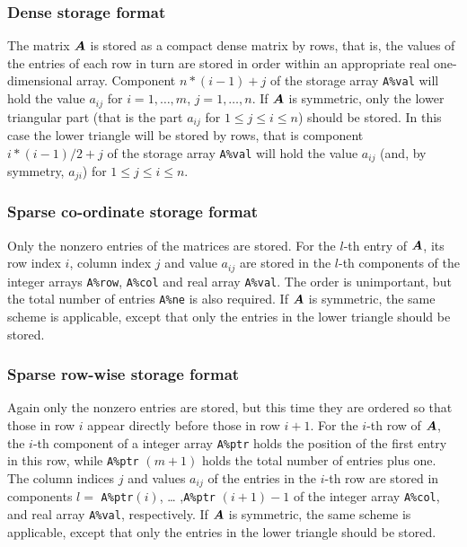 \documentclass{galahad}
\begin{document}
\subsubsection{Dense storage format}\label{dense}
The matrix ${\bm{A}}$ is stored as a compact 
dense matrix by rows, that is, the values of the entries of each row in turn are
stored in order within an appropriate real one-dimensional array.
Component $n \ast (i-1) + j$ of the storage array {\tt A\%val} will hold the 
value $a_{ij}$ for $i = 1, \ldots , m$, $j = 1, \ldots , n$.
If ${\bm{A}}$ is symmetric, only the lower triangular part (that is the part 
$a_{ij}$ for $1 \leq j \leq i \leq n$) should be stored.  In this case
the lower triangle will be stored by rows, that is 
component $i \ast (i-1)/2 + j$ of the storage array {\tt A\%val}  
will hold the value $a_{ij}$ (and, by symmetry, $a_{ji}$)
for $1 \leq j \leq i \leq n$.

\subsubsection{Sparse co-ordinate storage format}\label{coordinate}
Only the nonzero entries of the matrices are stored. For the $l$-th
entry of ${\bm{A}}$, its row index $i$, column index $j$ and value
$a_{ij}$ are stored in the $l$-th components of the integer arrays
{\tt A\%row}, {\tt A\%col} and real array {\tt A\%val}.  The order is
unimportant, but the total number of entries {\tt A\%ne} is also
required.  If ${\bm{A}}$ is symmetric, the same scheme is applicable,
except that only the entries in the lower triangle should be stored.

\subsubsection{Sparse row-wise storage format}\label{rowwise}
Again only the nonzero entries are stored, but this time they are
ordered so that those in row $i$ appear directly before those in row
$i+1$. For the $i$-th row of ${\bm{A}}$, the $i$-th component of a integer
array {\tt A\%ptr} holds the position of the first entry in this row,
while {\tt A\%ptr} $(m+1)$ holds the total number of entries plus one.
The column indices $j$ and values $a_{ij}$ of the entries in the
$i$-th row are stored in components $l =$ {\tt A\%ptr}$(i)$, \ldots
,{\tt A\%ptr} $(i+1)-1$ of the integer array {\tt A\%col}, and real
array {\tt A\%val}, respectively.  If ${\bm{A}}$ is symmetric, the same
scheme is applicable, except that only the entries in the lower
triangle should be stored.
\end{document}
